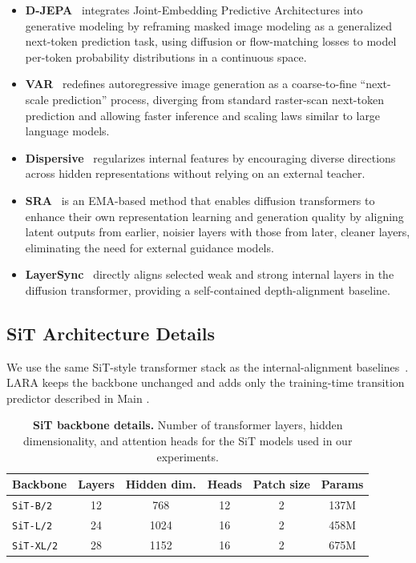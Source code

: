 \begin{itemize}[leftmargin=*]
    \item \textbf{D-JEPA}~\citep{chen2024jepa} integrates Joint-Embedding Predictive Architectures into generative modeling by reframing masked image modeling as a generalized next-token prediction task, using diffusion or flow-matching losses to model per-token probability distributions in a continuous space.
    \item \textbf{VAR}~\citep{tian2024visual} redefines autoregressive image generation as a coarse-to-fine ``next-scale prediction'' process, diverging from standard raster-scan next-token prediction and allowing faster inference and scaling laws similar to large language models.
    \item \textbf{Dispersive}~\citep{wang2025dispersive} regularizes internal features by encouraging diverse directions across hidden representations without relying on an external teacher.
    \item \textbf{SRA}~\citep{jiang2025sra} is an EMA-based method that enables diffusion transformers to enhance their own representation learning and generation quality by aligning latent outputs from earlier, noisier layers with those from later, cleaner layers, eliminating the need for external guidance models.
    \item \textbf{LayerSync}~\citep{haghighi2026layersync} directly aligns selected weak and strong internal layers in the diffusion transformer, providing a self-contained depth-alignment baseline.
\end{itemize}

\subsection{SiT Architecture Details}
\label{app:sit_architecture_details}

We use the same SiT-style transformer stack as the internal-alignment baselines~\citep{ma2024sit,haghighi2026layersync}. LARA keeps the backbone unchanged and adds only the training-time transition predictor described in Main .

\begin{table}[!htbp]
    \centering
    \caption{\textbf{SiT backbone details.} Number of transformer layers, hidden dimensionality, and attention heads for the SiT models used in our experiments.}
    \label{tab:appendix_sit_architecture}
    \scriptsize
    \setlength{\tabcolsep}{4pt}
    \begin{tabular}{lccccc}
        \toprule
        Backbone & Layers & Hidden dim. & Heads & Patch size & Params \\
        \midrule
        \texttt{SiT-B/2} & 12 & 768 & 12 & 2 & 137M \\
        \texttt{SiT-L/2} & 24 & 1024 & 16 & 2 & 458M \\
        \texttt{SiT-XL/2} & 28 & 1152 & 16 & 2 & 675M \\
        \bottomrule
    \end{tabular}
\end{table}

